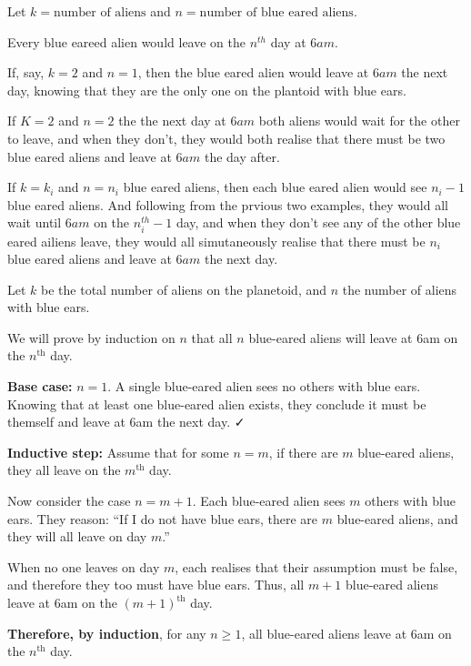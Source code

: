 \documentclass{tufte-handout}
\begin{document}

\begin{question}

\qpart

Let \( k = \text{number of aliens} \) and \( n = \text{number of blue eared aliens} \).

Every blue eareed alien would leave on the \( n^{th} \) day at \( 6am \).

\qpart

If, say, \( k=2 \) and  \( n=1 \), then the blue eared alien would leave at \( 6am \) the next day, knowing
that they are the only one on the plantoid with blue ears.

If \( K=2 \) and \( n=2 \) the the next day at \( 6am \) both aliens would wait for the other to leave, and when they don't, 
they would both realise that there must be two blue eared aliens and leave at \( 6am \) the day after.

If \( k=k_i \) and  \( n=n_i \) blue eared aliens, then each blue eared alien would see \( n_i-1 \) 
blue eared aliens. And following from the prvious two examples, they would all wait until \( 6am \)
on the \( n_i^{th}-1 \) day, and when they don't see any of the other blue eared ailiens leave, they would all 
simutaneously realise that there must be \( n_i \) blue eared aliens and leave at \( 6am \) the next day.



\end{question}

\begin{question}

\qpart

Let \( k \) be the total number of aliens on the planetoid, and \( n \) the number of aliens with blue ears.

We will prove by induction on \( n \) that all \( n \) blue-eared aliens will leave at 6am on the \( n^\text{th} \) day.

\textbf{Base case:} \( n = 1 \).  
A single blue-eared alien sees no others with blue ears. Knowing that at least one blue-eared alien exists, they conclude it must be themself and leave at 6am the next day. ✓

\textbf{Inductive step:}  
Assume that for some \( n = m \), if there are \( m \) blue-eared aliens, they all leave on the \( m^\text{th} \) day.

Now consider the case \( n = m + 1 \).  
Each blue-eared alien sees \( m \) others with blue ears. They reason:  
“If I do not have blue ears, there are \( m \) blue-eared aliens, and they will all leave on day \( m \).”

When no one leaves on day \( m \), each realises that their assumption must be false, and therefore they too must have blue ears.  
Thus, all \( m + 1 \) blue-eared aliens leave at 6am on the \( (m + 1)^\text{th} \) day.

\textbf{Therefore, by induction}, for any \( n \ge 1 \), all blue-eared aliens leave at 6am on the \( n^\text{th} \) day.

\end{question}
\end{document}
